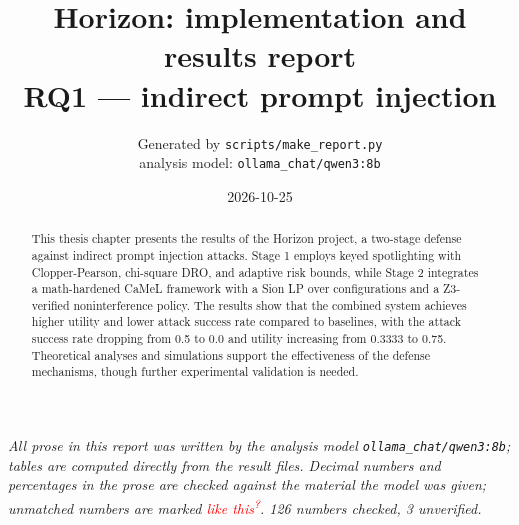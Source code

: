 \documentclass[11pt,a4paper]{article}
\title{Horizon: implementation and results report\\\large RQ1 — indirect prompt injection}
\author{Generated by \texttt{scripts/make\_report.py}\\ analysis model: \texttt{ollama\_chat/qwen3:8b}}
\date{2026-10-25}
\newcommand{\unverified}[1]{\textcolor{red}{#1\textsuperscript{?}}}
\begin{document}
\maketitle
\begin{abstract}
This thesis chapter presents the results of the Horizon project, a two-stage defense against indirect prompt injection attacks. Stage 1 employs keyed spotlighting with Clopper-Pearson, chi-square DRO, and adaptive risk bounds, while Stage 2 integrates a math-hardened CaMeL framework with a Sion LP over configurations and a Z3-verified noninterference policy. The results show that the combined system achieves higher utility and lower attack success rate compared to baselines, with the attack success rate dropping from 0.5 to 0.0 and utility increasing from 0.3333 to 0.75. Theoretical analyses and simulations support the effectiveness of the defense mechanisms, though further experimental validation is needed.
\end{abstract}
\noindent\small\textit{All prose in this report was written by the analysis model \texttt{ollama\_chat/qwen3:8b}; tables are computed directly from the result files. Decimal numbers and percentages in the prose are checked against the material the model was given; unmatched numbers are marked \unverified{like this}. 126 numbers checked, 3 unverified.}\normalsize
\tableofcontents
\newpage
\end{document}
